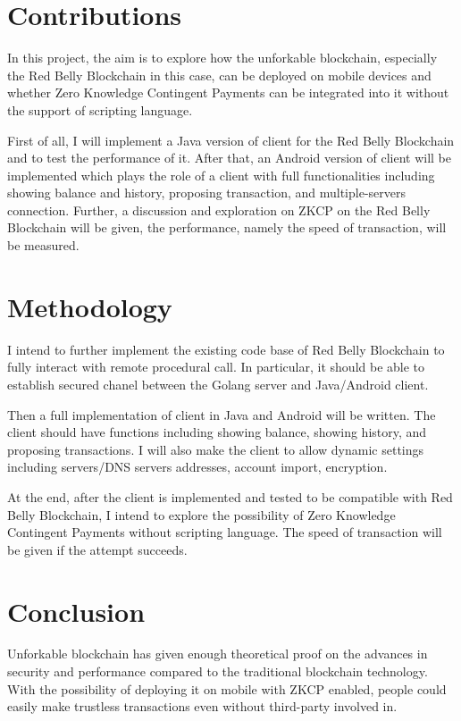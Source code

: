 \section{Contributions}

In this project, the aim is to explore how the unforkable blockchain, especially the Red Belly Blockchain in this case, can be deployed on mobile devices and whether Zero Knowledge Contingent Payments can be integrated into it without the support of scripting language.

First of all, I will implement a Java version of client for the Red Belly Blockchain and to test the performance of it. After that, an Android version of client will be implemented which plays the role of a client with full functionalities including showing balance and history, proposing transaction, and multiple-servers connection. Further, a discussion and exploration on ZKCP on the Red Belly Blockchain will be given, the performance, namely the speed of transaction, will be measured.

\section{Methodology}

I intend to further implement the existing code base of Red Belly Blockchain to fully interact with remote procedural call. In particular, it should be able to establish secured chanel between the Golang server and Java/Android client.

Then a full implementation of client in Java and Android will be written. The client should have functions including showing balance, showing history, and proposing transactions. I will also make the client to allow dynamic settings including servers/DNS servers addresses, account import, encryption.

At the end, after the client is implemented and tested to be compatible with Red Belly Blockchain, I intend to explore the possibility of Zero Knowledge Contingent Payments without scripting language. The speed of transaction will be given if the attempt succeeds.

\section{Conclusion}

Unforkable blockchain has given enough theoretical proof on the advances in security and performance compared to the traditional blockchain technology. With the possibility of deploying it on mobile with ZKCP enabled, people could easily make trustless transactions even without third-party involved in.


